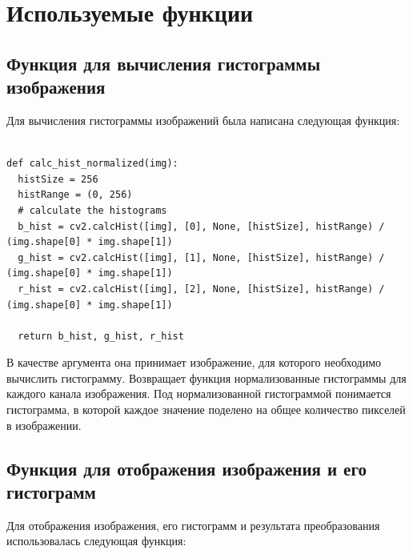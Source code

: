 \section{Используемые функции}

\subsection{Функция для вычисления гистограммы изображения}

Для вычисления гистограммы изображений была написана следующая функция:

\begin{lstlisting}

def calc_hist_normalized(img):
  histSize = 256
  histRange = (0, 256)
  # calculate the histograms
  b_hist = cv2.calcHist([img], [0], None, [histSize], histRange) / (img.shape[0] * img.shape[1])
  g_hist = cv2.calcHist([img], [1], None, [histSize], histRange) / (img.shape[0] * img.shape[1])
  r_hist = cv2.calcHist([img], [2], None, [histSize], histRange) / (img.shape[0] * img.shape[1])

  return b_hist, g_hist, r_hist
\end{lstlisting}

В качестве аргумента она принимает изображение, для которого необходимо вычислить гистограмму. Возвращает функция нормализованные гистограммы для каждого канала изображения.
Под нормализованной гистограммой понимается гистограмма, в которой каждое значение поделено на общее количество пикселей в изображении.

\subsection{Функция для отображения изображения и его гистограмм}
Для отображения изображения, его гистограмм и результата преобразования использовалась следующая функция: 


